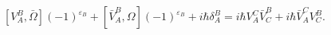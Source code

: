 \begin{equation}\label{4.8}
[V^B_A,\bar{\Omega}](-1)^{\varepsilon_B}+
[\bar{V}^B_A,\Omega](-1)^{\varepsilon_B}+i\hbar\delta^B_A=
i\hbar V^C_A\bar{V}^B_C+i\hbar\bar{V}^C_AV^B_C.
\end{equation}

